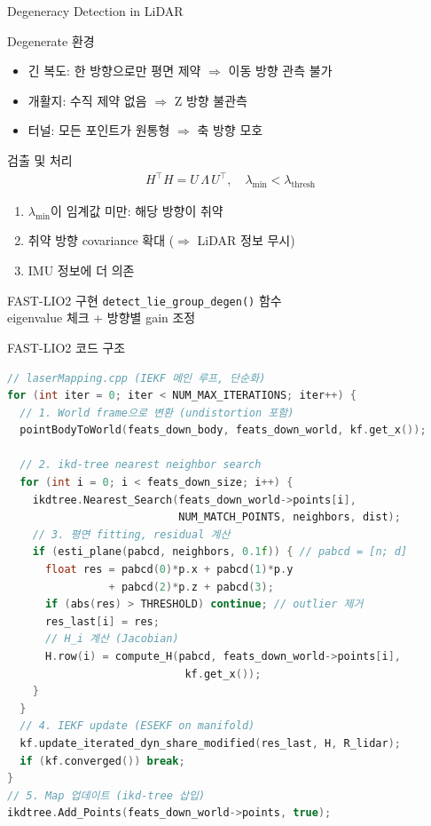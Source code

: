 \begin{frame}{Degeneracy Detection in LiDAR}
  \begin{block}{Degenerate 환경}
    \begin{itemize}
      \item 긴 복도: 한 방향으로만 평면 제약 $\Rightarrow$ 이동 방향 관측 불가
      \item 개활지: 수직 제약 없음 $\Rightarrow$ Z 방향 불관측
      \item 터널: 모든 포인트가 원통형 $\Rightarrow$ 축 방향 모호
    \end{itemize}
  \end{block}
  \pause
  \begin{block}{검출 및 처리}
    \begin{align*}
      H^\top H = U\,\Lambda\,U^\top, \quad
      \lambda_{\min} < \lambda_{\text{thresh}}
    \end{align*}
    \begin{enumerate}
      \item $\lambda_{\min}$이 임계값 미만: 해당 방향이 취약
      \item 취약 방향 covariance 확대 ($\Rightarrow$ LiDAR 정보 무시)
      \item IMU 정보에 더 의존
    \end{enumerate}
  \end{block}
  \pause
  \begin{exampleblock}{FAST-LIO2 구현}
    \texttt{detect\_lie\_group\_degen()} 함수\\
    eigenvalue 체크 + 방향별 gain 조정
  \end{exampleblock}
\end{frame}

\begin{frame}[fragile,shrink=10]{FAST-LIO2 코드 구조}
\begin{lstlisting}[language=C++]
// laserMapping.cpp (IEKF 메인 루프, 단순화)
for (int iter = 0; iter < NUM_MAX_ITERATIONS; iter++) {
  // 1. World frame으로 변환 (undistortion 포함)
  pointBodyToWorld(feats_down_body, feats_down_world, kf.get_x());

  // 2. ikd-tree nearest neighbor search
  for (int i = 0; i < feats_down_size; i++) {
    ikdtree.Nearest_Search(feats_down_world->points[i],
                           NUM_MATCH_POINTS, neighbors, dist);
    // 3. 평면 fitting, residual 계산
    if (esti_plane(pabcd, neighbors, 0.1f)) { // pabcd = [n; d]
      float res = pabcd(0)*p.x + pabcd(1)*p.y
                + pabcd(2)*p.z + pabcd(3);
      if (abs(res) > THRESHOLD) continue; // outlier 제거
      res_last[i] = res;
      // H_i 계산 (Jacobian)
      H.row(i) = compute_H(pabcd, feats_down_world->points[i],
                            kf.get_x());
    }
  }
  // 4. IEKF update (ESEKF on manifold)
  kf.update_iterated_dyn_share_modified(res_last, H, R_lidar);
  if (kf.converged()) break;
}
// 5. Map 업데이트 (ikd-tree 삽입)
ikdtree.Add_Points(feats_down_world->points, true);
\end{lstlisting}
\end{frame}


